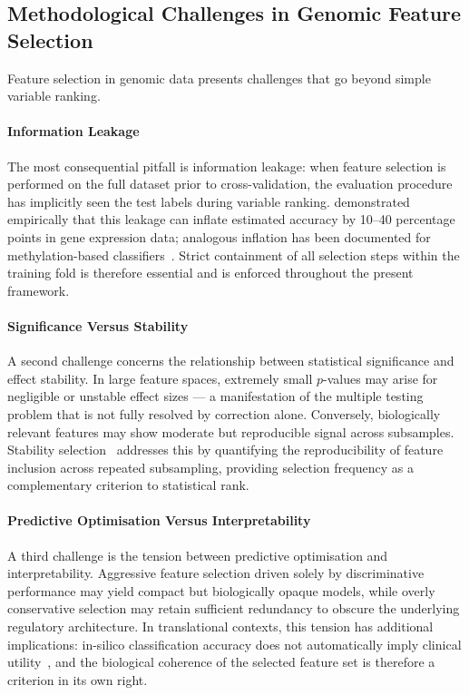 \subsection{Methodological Challenges in Genomic Feature Selection}
\label{subsec:fs_stability}
Feature selection in genomic data presents challenges that go beyond 
simple variable ranking.

\paragraph{Information Leakage}
The most consequential pitfall is information leakage: when feature 
selection is performed on the full dataset prior to cross-validation, 
the evaluation procedure has implicitly seen the test labels during 
variable ranking. \cite{Ambroise2002} demonstrated empirically that 
this leakage can inflate estimated accuracy by 10–40 percentage points 
in gene expression data; analogous inflation has been documented for 
methylation-based classifiers~\cite{Smialowski2010}. Strict containment 
of all selection steps within the training fold is therefore essential 
and is enforced throughout the present framework.

\paragraph{Significance Versus Stability}
A second challenge concerns the relationship between statistical 
significance and effect stability. In large feature spaces, extremely 
small $p$-values may arise for negligible or unstable effect sizes — a 
manifestation of the multiple testing problem that is not fully 
resolved by correction alone. Conversely, 
biologically relevant features may show moderate but reproducible 
signal across subsamples. Stability selection~\cite{Meinshausen2010} 
addresses this by quantifying the reproducibility of feature inclusion 
across repeated subsampling, providing selection frequency as a 
complementary criterion to statistical rank.

\paragraph{Predictive Optimisation Versus Interpretability}
A third challenge is the tension between predictive optimisation and 
interpretability. Aggressive feature selection driven solely by 
discriminative performance may yield compact but biologically opaque 
models, while overly conservative selection may retain sufficient 
redundancy to obscure the underlying regulatory architecture. In 
translational contexts, this tension has additional implications: 
in-silico classification accuracy does not automatically imply 
clinical utility~\cite{Poste2011}, and the biological coherence of 
the selected feature set is therefore a criterion in its own right.


